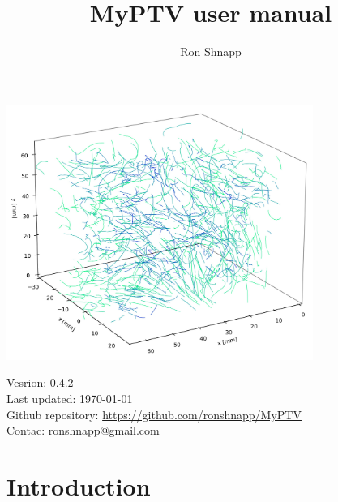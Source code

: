 \documentclass[10pt,a4paper]{article}
\title{MyPTV user manual}
\author{Ron Shnapp}
\date{}
\begin{document}
	
	



\maketitle

\thispagestyle{empty}
\vspace{3.5cm}

\begin{center}
	\includegraphics[width=10cm]{traj_image.jpg}
\end{center}

\vfill

\begin{minipage}{10cm}
	{\small 
	Vesrion: 0.4.2 \\
	Last updated: \today \\
	Github repository: \url{https://github.com/ronshnapp/MyPTV} \\
	Contac: ronshnapp@gmail.com}
\end{minipage}



\newpage
\tableofcontents
{}
\newpage











\section{Introduction}
\end{document}
